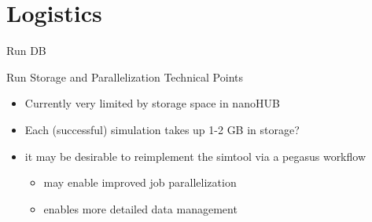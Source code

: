 \documentclass[8pt, compress]{beamer}
\begin{document}
\section{Logistics}
\label{sec:org01d6653}
\begin{frame}[label={sec:orge7dbfa6}]{Run DB}
\begin{block}{Run Storage and Parallelization Technical Points}
\begin{itemize}
\item Currently very limited by storage space in nanoHUB
\item Each (successful) simulation takes up 1-2 GB in storage?
\item it may be desirable to reimplement the simtool via a pegasus workflow
\begin{itemize}
\item may enable improved job parallelization
\item enables more detailed data management
\end{itemize}
\end{itemize}
\end{block}
\end{frame}
\end{document}
